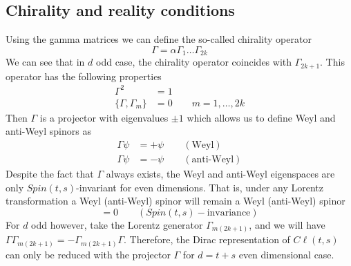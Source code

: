 \documentclass[a4paper,12pt]{article}
\numberwithin{equation}{section}
\numberwithin{thm}{section}
\numberwithin{exm}{section}
\newcommand{\<}{{\langle}}
\renewcommand{\>}{{\rangle}}
\renewcommand{\a}{{\alpha}}
\newcommand{\G}{{\Gamma}}
\begin{document}
\subsection{Chirality and reality conditions}
Using the gamma matrices we can define the so-called chirality operator
	\begin{equation}
	\G = \a\G_1\ldots\G_{2k}
	\end{equation}
We can see that in $d$ odd case, the chirality operator coincides with $\G_{2k+1}$. This operator has the following properties
	\begin{align}
	\G^2 & = 1 \\
	\{\G,\G_m\} & = 0\qquad m=1,\ldots,2k
	\end{align}
Then $\G$ is a projector with eigenvalues $\pm 1$ which allows us to define Weyl and anti-Weyl spinors as
	\begin{equation}
		\begin{aligned}
		\G \psi & = + \psi \qquad (\text{Weyl}) \\
		\G \psi & = - \psi \qquad (\text{anti-Weyl})
		\end{aligned}
	\end{equation}
Despite the fact that $\G$ always exists, the Weyl and anti-Weyl eigenspaces are only $Spin(t,s)$-invariant for even dimensions. That is, under any Lorentz transformation a Weyl (anti-Weyl) spinor will remain a Weyl (anti-Weyl) spinor
	\begin{equation}
	[\G, \G_{mn}] = 0\qquad (Spin(t,s)-\text{invariance})
	\end{equation}
For $d$ odd however, take the Lorentz generator $\G_{m (2k+1)}$, and we will have $\G \G_{m (2k+1)} = -\G_{m (2k+1)} \G$. Therefore, the Dirac representation of $C\ell(t,s)$ can only be reduced with the projector $\G$ for $d=t+s$ even dimensional case.
\end{document}
